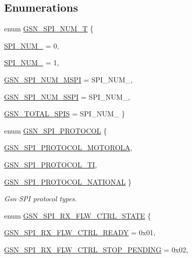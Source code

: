 \subsection*{Enumerations}
\begin{DoxyCompactItemize}
\item 
enum \hyperlink{a00587_a8158d263babcdfe1b3b113e23acd1bf7}{GSN\_\-SPI\_\-NUM\_\-T} \{ \par
\hyperlink{a00587_a8158d263babcdfe1b3b113e23acd1bf7a355d6fc59709893547ab5ad52b675afd}{SPI\_\-NUM\_} =  0, 
\par
\hyperlink{a00587_a8158d263babcdfe1b3b113e23acd1bf7ac1ce77771a9fcfa5a154ce1b5147c171}{SPI\_\-NUM\_} =  1, 
\par
\hyperlink{a00587_a8158d263babcdfe1b3b113e23acd1bf7ad0a947040f7568169fa89f259818e24c}{GSN\_\-SPI\_\-NUM\_\-MSPI} =  SPI\_\-NUM\_, 
\par
\hyperlink{a00587_a8158d263babcdfe1b3b113e23acd1bf7a30f602b432a624056e8b621d60c07f59}{GSN\_\-SPI\_\-NUM\_\-SSPI} =  SPI\_\-NUM\_, 
\par
\hyperlink{a00587_a8158d263babcdfe1b3b113e23acd1bf7ae7e7298752aff8ce0ca30badc092a296}{GSN\_\-TOTAL\_\-SPIS} =  SPI\_\-NUM\_
 \}
\item 
enum \hyperlink{a00655_gaaabdab9df4e565fb0f07162bb2f22dc4}{GSN\_\-SPI\_\-PROTOCOL} \{ \par
\hyperlink{a00655_ggaaabdab9df4e565fb0f07162bb2f22dc4a49e9fa78d3280c54236b7b4160f22ec2}{GSN\_\-SPI\_\-PROTOCOL\_\-MOTOROLA}, 
\par
\hyperlink{a00655_ggaaabdab9df4e565fb0f07162bb2f22dc4a9728b79e3085a9f2a92a49d7d3e88cea}{GSN\_\-SPI\_\-PROTOCOL\_\-TI}, 
\par
\hyperlink{a00655_ggaaabdab9df4e565fb0f07162bb2f22dc4adc033576463c374bb615509e89dd84e5}{GSN\_\-SPI\_\-PROTOCOL\_\-NATIONAL}
 \}
\begin{DoxyCompactList}\small\item\em Gsn SPI protocol types. \end{DoxyCompactList}\item 
enum \hyperlink{a00587_ad34f711f03e3ba0055566119931ebfa6}{GSN\_\-SPI\_\-RX\_\-FLW\_\-CTRL\_\-STATE} \{ \par
\hyperlink{a00587_ad34f711f03e3ba0055566119931ebfa6ab092c6de33f79701c1b685352b298edb}{GSN\_\-SPI\_\-RX\_\-FLW\_\-CTRL\_\-READY} =  0x01, 
\par
\hyperlink{a00587_ad34f711f03e3ba0055566119931ebfa6aeea49d95c57b3b8fe30560ad0c6c6b00}{GSN\_\-SPI\_\-RX\_\-FLW\_\-CTRL\_\-STOP\_\-PENDING} =  0x02, 

\end{DoxyCompactItemize}

